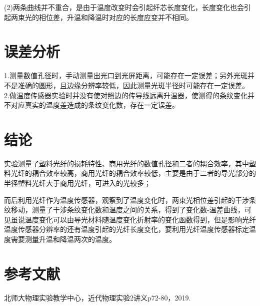 \documentclass[UTF8]{ctexart}
\begin{document}
\begin{multicols}{2}
(2)两条曲线并不重合，是由于温度改变时会引起纤芯长度变化，长度变化也会引起两束光的相位差，升温和降温时对应的长度应变并不相同。

\section{误差分析}
\noindent 1.测量数值孔径时，手动测量出光口到光屏距离，可能存在一定误差；另外光斑并不是准确的圆形，且边缘分辨率较低，因此测量光斑半径时可能存在一定误差。
\newline 2.做温度传感器实验时并没有使对照边的传导线远离升温器，使测得的条纹变化并不对应真实的温度差造成的条纹变化数，存在一定误差。

\section{结论}
实验测量了塑料光纤的损耗特性、商用光纤的数值孔径和二者的耦合效率，其中塑料光纤的耦合效率较高，商用光纤的耦合效率较低，主要是由于二者的导光部分的半径塑料光纤大于商用光纤，可进入的光较多；

而后利用光纤作为温度传感器，观察到了温度变化时，两束光相位差引起的干涉条纹移动，测量了干涉条纹变化数和温度之间的关系，得到了变化数-温差曲线，可见虽说温度变化可以由导光材料随温度变化折射率的变化函数得到，但是影响光纤温度传感器分辨率的还有温度引起的光纤长度变化，要利用光纤温度传感器标定温度需要测量升温和降温两次的温度。

\section{参考文献}
\small
\noindent[1]北师大物理实验教学中心，近代物理实验2讲义p72-80，2019.

\end{multicols}
\end{document}
